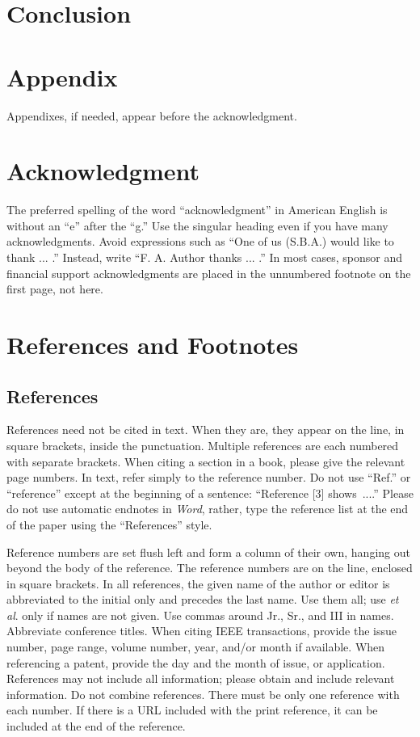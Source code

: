 \documentclass[journal]{IEEEtai}
\begin{document}
\section{Conclusion}



\section*{Appendix}

Appendixes, if needed, appear before the acknowledgment.

\section*{Acknowledgment}

The preferred spelling of the word ``acknowledgment'' in American English is without an ``e'' after the ``g.'' Use the singular heading even if you have many acknowledgments. Avoid expressions such as ``One of us (S.B.A.) would like to thank ... .'' Instead, write ``F. A. Author thanks ... .'' In most cases, sponsor and financial support acknowledgments are placed in the unnumbered footnote on the first page, not here.

\section*{References and Footnotes}

\subsection{References}

References need not be cited in text. When they are, they appear on the line, in square brackets, inside the punctuation. Multiple references are each numbered with separate brackets. When citing a section in a book, please give the relevant page numbers. In text, refer simply to the reference number. Do not use ``Ref.'' or ``reference'' except at the beginning of a sentence: ``Reference [3] shows~....'' Please do not use automatic endnotes in {\it Word}, rather, type the reference list at the end of the paper using the ``References''  style.

Reference numbers are set flush left and form a column of their own, hanging out beyond the body of the reference. The reference numbers are on the line, enclosed in square brackets. In all references, the given name of the author or editor is abbreviated to the initial only and precedes the last name. Use them all; use {\it et al}. only if names are not given. Use commas around Jr., Sr., and III in names. Abbreviate conference titles. When citing IEEE transactions, provide the issue number, page range, volume number, year, and/or month if available. When referencing a patent, provide the day and the month of issue, or application. References may not include all information; please obtain and include relevant information. Do not combine references. There must be only one reference with each number. If there is a URL included with the print reference, it can be included at the end of the reference. 
\end{document}
